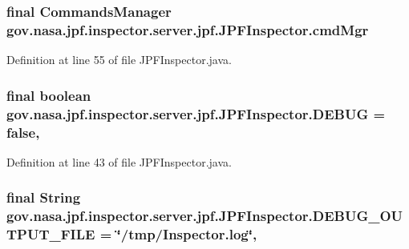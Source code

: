 \subsubsection[{\texorpdfstring{cmd\+Mgr}{cmdMgr}}]{\setlength{\rightskip}{0pt plus 5cm}final {\bf Commands\+Manager} gov.\+nasa.\+jpf.\+inspector.\+server.\+jpf.\+J\+P\+F\+Inspector.\+cmd\+Mgr\hspace{0.3cm}{\ttfamily [protected]}}\hypertarget{classgov_1_1nasa_1_1jpf_1_1inspector_1_1server_1_1jpf_1_1_j_p_f_inspector_a2341e868d4144a72f81153fb68efc39f}{}\label{classgov_1_1nasa_1_1jpf_1_1inspector_1_1server_1_1jpf_1_1_j_p_f_inspector_a2341e868d4144a72f81153fb68efc39f}


Definition at line 55 of file J\+P\+F\+Inspector.\+java.

\subsubsection[{\texorpdfstring{D\+E\+B\+UG}{DEBUG}}]{\setlength{\rightskip}{0pt plus 5cm}final boolean gov.\+nasa.\+jpf.\+inspector.\+server.\+jpf.\+J\+P\+F\+Inspector.\+D\+E\+B\+UG = false\hspace{0.3cm}{\ttfamily [static]}, {\ttfamily [protected]}}\hypertarget{classgov_1_1nasa_1_1jpf_1_1inspector_1_1server_1_1jpf_1_1_j_p_f_inspector_a53359fda8287a93e377022db230c7c1b}{}\label{classgov_1_1nasa_1_1jpf_1_1inspector_1_1server_1_1jpf_1_1_j_p_f_inspector_a53359fda8287a93e377022db230c7c1b}


Definition at line 43 of file J\+P\+F\+Inspector.\+java.

\subsubsection[{\texorpdfstring{D\+E\+B\+U\+G\+\_\+\+O\+U\+T\+P\+U\+T\+\_\+\+F\+I\+LE}{DEBUG_OUTPUT_FILE}}]{\setlength{\rightskip}{0pt plus 5cm}final String gov.\+nasa.\+jpf.\+inspector.\+server.\+jpf.\+J\+P\+F\+Inspector.\+D\+E\+B\+U\+G\+\_\+\+O\+U\+T\+P\+U\+T\+\_\+\+F\+I\+LE = \char`\"{}/tmp/Inspector.\+log\char`\"{}\hspace{0.3cm}{\ttfamily [static]}, {\ttfamily [private]}}\hypertarget{classgov_1_1nasa_1_1jpf_1_1inspector_1_1server_1_1jpf_1_1_j_p_f_inspector_a1f8b5dc136f3fb2904ccb4d6f230b723}{}\label{classgov_1_1nasa_1_1jpf_1_1inspector_1_1server_1_1jpf_1_1_j_p_f_inspector_a1f8b5dc136f3fb2904ccb4d6f230b723}


